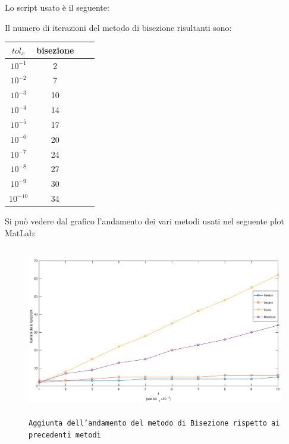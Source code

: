 \begin{flushleft}
Lo script usato è il seguente:

Il numero di iterazioni del metodo di bisezione risultanti sono:

\begin{center}
\begin{tabular}{|c|c|c|c|}
\hline
$tol_x$ & bisezione \\
\hline
$10^{-1}$ & 2 \\
$10^{-2}$ & 7 \\
$10^{-3}$ & 10 \\
$10^{-4}$ & 14 \\
$10^{-5}$ & 17 \\
$10^{-6}$ & 20 \\
$10^{-7}$ & 24 \\
$10^{-8}$ & 27 \\
$10^{-9}$ & 30 \\
$10^{-10}$ & 34 \\
\hline
\end{tabular}
\end{center}

Si può vedere dal grafico l'andamento dei vari metodi usati nel seguente plot MatLab:
\begin{figure}[H]
\label{fes27}
\includegraphics[width=480px, height=280px]{plot/fes27}
\caption{\texttt{Aggiunta dell'andamento del metodo di Bisezione rispetto ai precedenti metodi}}
\end{figure}

\end{flushleft}